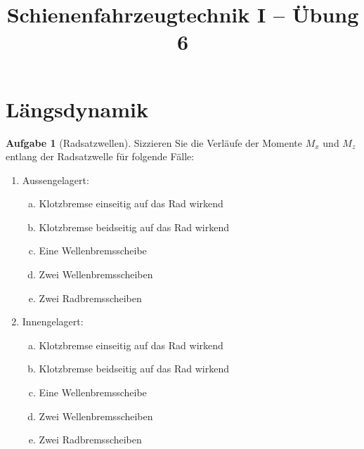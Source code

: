\documentclass[10pt,a4paper,headsepline,smallheadings]{scrartcl}
\title{Schienenfahrzeugtechnik I  -- \"Ubung 6}
\date{}
\theoremstyle{definition}
\newtheorem{aufgabe}{Aufgabe}
\begin{document}
\thispagestyle{empty}
\maketitle
\vspace{-2cm}

\section*{L\"angsdynamik}

\begin{aufgabe}[Radsatzwellen]
Sizzieren Sie die Verl\"aufe der Momente $M_{x}$ und $M_{z}$ entlang der Radsatzwelle f\"ur folgende F\"alle:
\begin{enumerate}
\item Aussengelagert:
	\begin{enumerate}[a)]
	\item Klotzbremse einseitig auf das Rad wirkend
	\item Klotzbremse beidseitig auf das Rad wirkend
	\item Eine Wellenbremsscheibe
	\item Zwei Wellenbremsscheiben
	\item Zwei Radbremsscheiben
	\end{enumerate}
\item Innengelagert:
	\begin{enumerate}[a)]
	\item Klotzbremse einseitig auf das Rad wirkend
	\item Klotzbremse beidseitig auf das Rad wirkend
	\item Eine Wellenbremsscheibe
	\item Zwei Wellenbremsscheiben
	\item Zwei Radbremsscheiben
	\end{enumerate}
\end{enumerate}

\end{aufgabe}
\newpage
\end{document}
